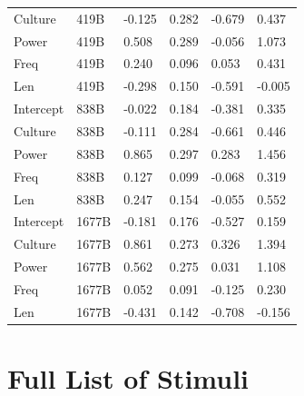 \documentclass[
  12pt,
  letterpaper,
]{scrreprt}
\begin{document}
\begin{longtable}[]{@{}llllll@{}}
Culture & 419B & -0.125 & 0.282 & -0.679 & 0.437 \\
Power & 419B & 0.508 & 0.289 & -0.056 & 1.073 \\
Freq & 419B & 0.240 & 0.096 & 0.053 & 0.431 \\
Len & 419B & -0.298 & 0.150 & -0.591 & -0.005 \\
Intercept & 838B & -0.022 & 0.184 & -0.381 & 0.335 \\
Culture & 838B & -0.111 & 0.284 & -0.661 & 0.446 \\
Power & 838B & 0.865 & 0.297 & 0.283 & 1.456 \\
Freq & 838B & 0.127 & 0.099 & -0.068 & 0.319 \\
Len & 838B & 0.247 & 0.154 & -0.055 & 0.552 \\
Intercept & 1677B & -0.181 & 0.176 & -0.527 & 0.159 \\
Culture & 1677B & 0.861 & 0.273 & 0.326 & 1.394 \\
Power & 1677B & 0.562 & 0.275 & 0.031 & 1.108 \\
Freq & 1677B & 0.052 & 0.091 & -0.125 & 0.230 \\
Len & 1677B & -0.431 & 0.142 & -0.708 & -0.156 \\

\end{longtable}

\chapter{Full List of Stimuli}\label{sec-full-list-of-stimuli}

\tiny
\end{document}
